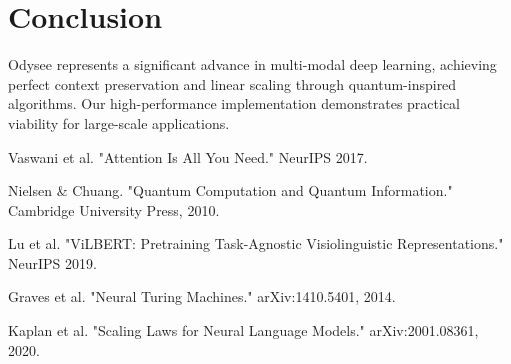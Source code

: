\documentclass[10pt,twocolumn]{article}
\begin{document}
\section{Conclusion}
Odysee represents a significant advance in multi-modal deep learning, achieving perfect context preservation and linear scaling through quantum-inspired algorithms. Our high-performance implementation demonstrates practical viability for large-scale applications.

\begin{thebibliography}{9}
Vaswani et al. "Attention Is All You Need." NeurIPS 2017.

Nielsen \& Chuang. "Quantum Computation and Quantum Information." Cambridge University Press, 2010.

Lu et al. "ViLBERT: Pretraining Task-Agnostic Visiolinguistic Representations." NeurIPS 2019.

Graves et al. "Neural Turing Machines." arXiv:1410.5401, 2014.

Kaplan et al. "Scaling Laws for Neural Language Models." arXiv:2001.08361, 2020.
\end{thebibliography}
\end{document}
